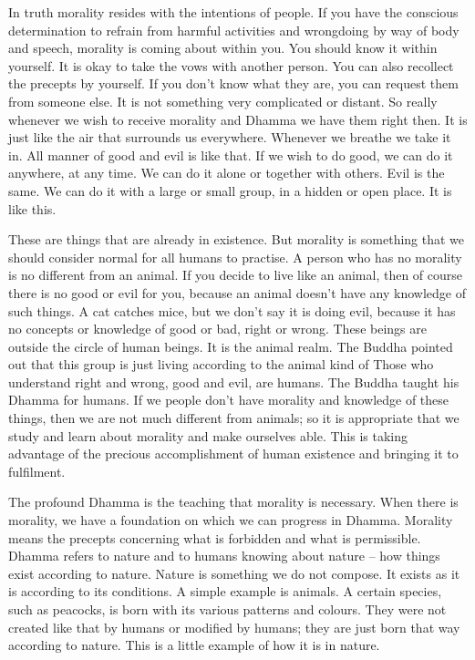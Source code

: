 In truth morality resides with the intentions of people. If you have the conscious determination to refrain from harmful activities and wrongdoing by way of body and speech, morality is coming about within you. You should know it within yourself. It is okay to take the vows with another person. You can also recollect the precepts by yourself. If you don't know what they are, you can request them from someone else. It is not something very complicated or distant. So really whenever we wish to receive morality and Dhamma we have them right then. It is just like the air that surrounds us everywhere. Whenever we breathe we take it in. All manner of good and evil is like that. If we wish to do good, we can do it anywhere, at any time. We can do it alone or together with others. Evil is the same. We can do it with a large or small group, in a hidden or open place. It is like this. 

These are things that are already in existence. But morality is something that we should consider normal for all humans to practise. A person who has no morality is no different from an animal. If you decide to live like an animal, then of course there is no good or evil for you, because an animal doesn't have any knowledge of such things. A cat catches mice, but we don't say it is doing evil, because it has no concepts or knowledge of good or bad, right or wrong. These beings are outside the circle of human beings. It is the animal realm. The Buddha pointed out that this group is just living according to the animal kind of  Those who understand right and wrong, good and evil, are humans. The Buddha taught his Dhamma for humans. If we people don't have morality and knowledge of these things, then we are not much different from animals; so it is \mbox{appropriate} that we study and learn about morality and make ourselves able. This is taking advantage of the precious accomplishment of human existence and bringing it to fulfilment. 

The profound Dhamma is the teaching that morality is necessary. When there is morality, we have a foundation on which we can progress in Dhamma. Morality means the precepts concerning what is forbidden and what is permissible. Dhamma refers to nature and to humans knowing about nature -- how things exist according to nature. Nature is something we do not compose. It exists as it is according to its conditions. A simple example is animals. A certain species, such as peacocks, is born with its various patterns and colours. They were not created like that by humans or modified by humans; they are just born that way according to nature. This is a little example of how it is in nature. 

